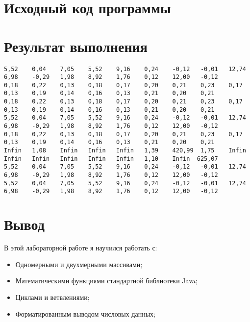 \documentclass[12pt,onecolumn]{article}
\begin{document}
\section{Исходный код программы}

\newpage
\section{Результат выполнения}
\begin{lstlisting}[basicstyle=\ttfamily\fontsize{6pt}{6pt}\selectfont]
5,52	0,04	7,05	5,52	9,16	0,24	-0,12	-0,01	12,74	6,98	-0,29	1,98	8,92	1,76	0,12	12,00	-0,12	
0,18	0,22	0,13	0,18	0,17	0,20	0,21	0,23	0,17	0,13	0,19	0,14	0,16	0,13	0,21	0,20	0,21	
0,18	0,22	0,13	0,18	0,17	0,20	0,21	0,23	0,17	0,13	0,19	0,14	0,16	0,13	0,21	0,20	0,21	
5,52	0,04	7,05	5,52	9,16	0,24	-0,12	-0,01	12,74	6,98	-0,29	1,98	8,92	1,76	0,12	12,00	-0,12	
0,18	0,22	0,13	0,18	0,17	0,20	0,21	0,23	0,17	0,13	0,19	0,14	0,16	0,13	0,21	0,20	0,21	
Infin	1,08	Infin	Infin	Infin	1,39	420,99	1,75	Infin	Infin	Infin	Infin	Infin	Infin	1,10	Infin  625,07	
5,52	0,04	7,05	5,52	9,16	0,24	-0,12	-0,01	12,74	6,98	-0,29	1,98	8,92	1,76	0,12	12,00	-0,12	
5,52	0,04	7,05	5,52	9,16	0,24	-0,12	-0,01	12,74	6,98	-0,29	1,98	8,92	1,76	0,12	12,00	-0,12
\end{lstlisting}
\section{Вывод}
В этой лабораторной работе я научился работать с:
\begin{itemize}
\item Одномерными и двухмерными массивами;
\item Математическими функциями стандартной библиотеки Java;
\item Циклами и ветвлениями;
\item Форматированным выводом числовых данных;


\end{itemize}
\end{document}
